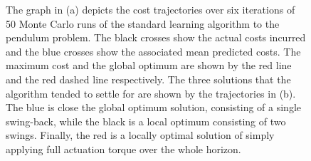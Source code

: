 \begin{figure}
{
\label{fig:standj1}
}
\caption{The graph in (a) depicts the cost trajectories over six iterations of 50 Monte Carlo runs of the standard learning algorithm to the pendulum problem. The black crosses show the actual costs incurred and the blue crosses show the associated mean predicted costs. The maximum cost and the global optimum are shown by the red line and the red dashed line respectively. The three solutions that the algorithm tended to settle for are shown by the trajectories in (b). The blue is close the global optimum solution, consisting of a single swing-back, while the black is a local optimum consisting of two swings. Finally, the red is a locally optimal solution of simply applying full actuation torque over the whole horizon.}
\label{fig:stand1}
\end{figure}




